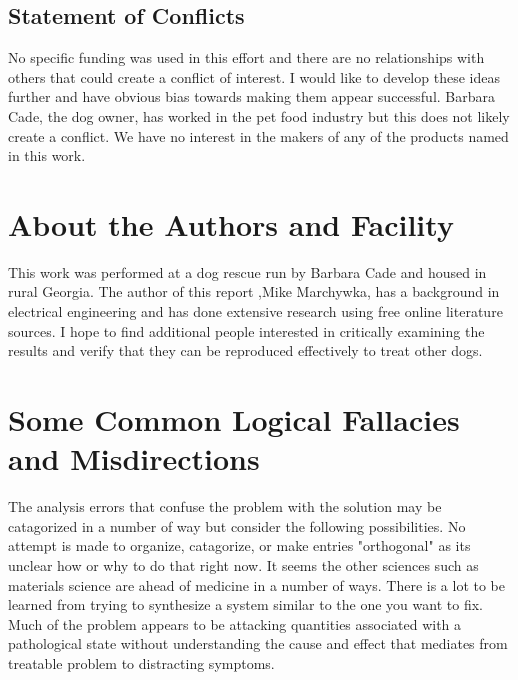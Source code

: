 \begin{mdpicomment}

\section{ Statement of Conflicts }
 No specific funding was used in this effort and there are no relationships
with others that could create a conflict of interest. I would like to develop
these ideas further and have obvious bias towards making them appear 
successful. Barbara Cade, the dog owner, has worked in the pet food industry
but this does not likely create a conflict. We have no interest in the
makers of any of the products named in this work.  

\end{mdpicomment}

\begin{mdpicomment}
\section{About the Authors and Facility}
This work was performed at a dog rescue run by Barbara Cade and
housed in rural Georgia.  The author of this report 
,Mike Marchywka,
has a background in electrical engineering and 
has done extensive research using free online literature sources.  
I hope to find additional people interested in critically 
examining the results and verify that they can be reproduced
effectively to treat other dogs.

\begin{comment}
\begin{figure}[htb] 
\centering
\mjmed{ picture commented out to save space in drafts...  } 
\caption{ 
 }
\end{figure}

\end{comment}



\section{Some Common Logical Fallacies and Misdirections}
\label{appendix:errors}

The analysis errors that confuse the problem with the
solution may be catagorized in a number of way but
consider the following possibilities. No attempt is made
to organize, catagorize, or make entries "orthogonal"
as its unclear how or why to do that right now.  
It seems the other sciences such as materials science are
ahead of medicine in a number of ways. There is a lot to
be learned from trying to synthesize a system similar to the
one you want to fix. Much of the problem appears to be attacking
quantities associated with a pathological state without understanding
the cause and effect that mediates from treatable problem to
distracting symptoms. 



\end{mdpicomment}

